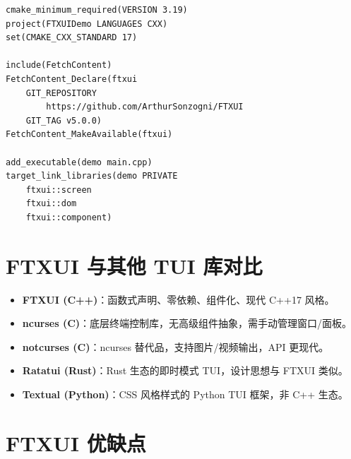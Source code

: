 \documentclass[12pt,a4paper,fontset=fandol]{ctexbook}
\newcommand{\cmakelabel}{%
  \tcbox[on line,colback=cppheadbg!80!black,colframe=cppheadbg!80!black,
    boxrule=0pt,arc=1pt,left=2pt,right=2pt,top=1pt,bottom=1pt,
    colupper=white,fontupper=\scriptsize\bfseries]{CMake}}
\begin{document}
\cmakelabel
\begin{lstlisting}[style=cmakestyle]
cmake_minimum_required(VERSION 3.19)
project(FTXUIDemo LANGUAGES CXX)
set(CMAKE_CXX_STANDARD 17)

include(FetchContent)
FetchContent_Declare(ftxui
    GIT_REPOSITORY
        https://github.com/ArthurSonzogni/FTXUI
    GIT_TAG v5.0.0)
FetchContent_MakeAvailable(ftxui)

add_executable(demo main.cpp)
target_link_libraries(demo PRIVATE
    ftxui::screen
    ftxui::dom
    ftxui::component)
\end{lstlisting}

\section{FTXUI 与其他 TUI 库对比}

\begin{compare}[title=TUI 生态横向比较]
\begin{itemize}
  \item \textbf{FTXUI (C++)}：函数式声明、零依赖、组件化、现代 C++17 风格。
  \item \textbf{ncurses (C)}：底层终端控制库，无高级组件抽象，需手动管理窗口/面板。
  \item \textbf{notcurses (C)}：ncurses 替代品，支持图片/视频输出，API 更现代。
  \item \textbf{Ratatui (Rust)}：Rust 生态的即时模式 TUI，设计思想与 FTXUI 类似。
  \item \textbf{Textual (Python)}：CSS 风格样式的 Python TUI 框架，非 C++ 生态。
\end{itemize}
\end{compare}

\section{FTXUI 优缺点}
\end{document}
